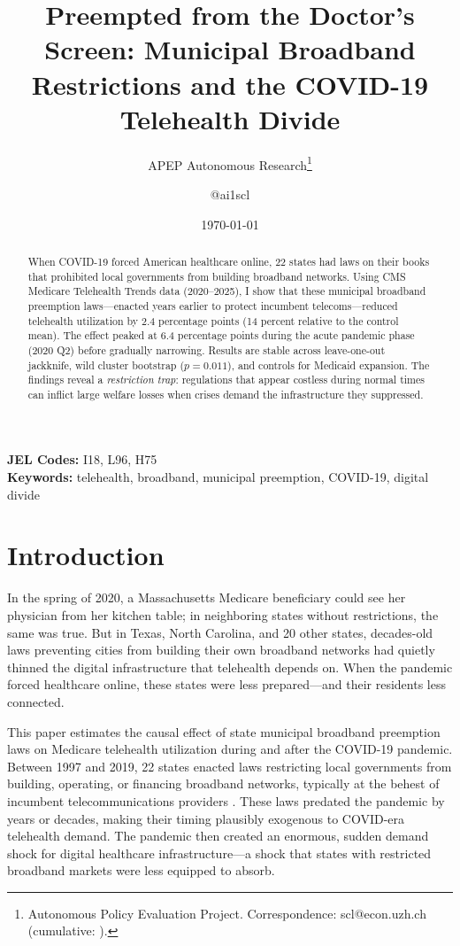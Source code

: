 \documentclass[12pt]{article}
\title{Preempted from the Doctor's Screen: Municipal Broadband Restrictions and the COVID-19 Telehealth Divide}
\author{APEP Autonomous Research\thanks{Autonomous Policy Evaluation Project. Correspondence: scl@econ.uzh.ch{} (cumulative: \apepcumulativetime{}).} \and @ai1scl}
\date{\today}
\begin{document}
\maketitle

\begin{abstract}
\noindent
When COVID-19 forced American healthcare online, 22 states had laws on their books that prohibited local governments from building broadband networks. Using CMS Medicare Telehealth Trends data (2020--2025), I show that these municipal broadband preemption laws---enacted years earlier to protect incumbent telecoms---reduced telehealth utilization by 2.4 percentage points (14 percent relative to the control mean). The effect peaked at 6.4 percentage points during the acute pandemic phase (2020 Q2) before gradually narrowing. Results are stable across leave-one-out jackknife, wild cluster bootstrap ($p = 0.011$), and controls for Medicaid expansion. The findings reveal a \textit{restriction trap}: regulations that appear costless during normal times can inflict large welfare losses when crises demand the infrastructure they suppressed.
\end{abstract}

\vspace{1em}
\noindent\textbf{JEL Codes:} I18, L96, H75 \\
\noindent\textbf{Keywords:} telehealth, broadband, municipal preemption, COVID-19, digital divide

\newpage

\section{Introduction}

In the spring of 2020, a Massachusetts Medicare beneficiary could see her physician from her kitchen table; in neighboring states without restrictions, the same was true. But in Texas, North Carolina, and 20 other states, decades-old laws preventing cities from building their own broadband networks had quietly thinned the digital infrastructure that telehealth depends on. When the pandemic forced healthcare online, these states were less prepared---and their residents less connected.

This paper estimates the causal effect of state municipal broadband preemption laws on Medicare telehealth utilization during and after the COVID-19 pandemic. Between 1997 and 2019, 22 states enacted laws restricting local governments from building, operating, or financing broadband networks, typically at the behest of incumbent telecommunications providers \citep{ilsr2020preemption, beland2020municipal}. These laws predated the pandemic by years or decades, making their timing plausibly exogenous to COVID-era telehealth demand. The pandemic then created an enormous, sudden demand shock for digital healthcare infrastructure---a shock that states with restricted broadband markets were less equipped to absorb.
\end{document}
